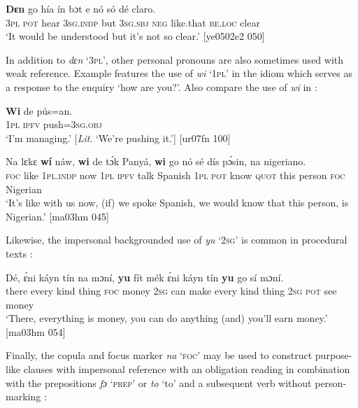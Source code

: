 \ea%
    \label{ex:key:1349}
    \gll \textbf{Dɛn}    go  hía    ín    bɔt  e    nó  só    dé    claro.\\
\textsc{3pl}    \textsc{pot}  hear    \textsc{3sg.indp}  but  \textsc{3sg.sbj}  \textsc{neg}  like.that  \textsc{be.loc}  clear\\

\glt ‘It would be understood but it’s not so clear.’ [ye0502e2 050]
\z

In addition to \textit{dɛn} ‘\textsc{3pl}’, other personal pronouns are also sometimes used with weak reference. Example  features the use of \textit{wi} ‘\textsc{1pl}’ in the idiom which serves as a response to the enquiry ‘how are you?’. Also compare the use of \textit{wi} in :


\ea%
    \label{ex:key:1350}
    \gll \textbf{Wi}  de  pús=an.\\
\textsc{1pl}  \textsc{ipfv}  push=\textsc{3sg.obj}\\

\glt ‘I’m managing.’ [\textit{Lit}. ‘We’re pushing it.’] [ur07fn 100]
\z


\ea%
    \label{ex:key:1351}
    \gll Na  lɛkɛ    \textbf{wí}    náw,  \textbf{wi}  de  tɔ́k  Panyá,  \textbf{wi}  go
nó    sé    dís  pɔ́sin,  na  nigeriano.\\
\textsc{foc}  like    \textsc{1pl.indp}  now    \textsc{1pl}  \textsc{ipfv}  talk  Spanish  \textsc{1pl}  \textsc{pot}
know  \textsc{quot}    this  person  \textsc{foc}  Nigerian\\

\glt ‘It’s like with us now, (if) we spoke Spanish, we would know
that this person, is Nigerian.’ [ma03hm 045]
\z

Likewise, the impersonal backgrounded use of \textit{yu} ‘\textsc{2sg}’ is common in procedural texts :


\ea%
    \label{ex:key:1352}
    \gll Dé,    ɛ́ni    káyn  tín    na  mɔní,  \textbf{yu}  fít  mék
ɛ́ni    káyn  tín    \textbf{yu}  go  sí  mɔní.\\
there  every  kind    thing  \textsc{foc}  money  \textsc{2sg}  can  make
every  kind    thing  \textsc{2sg}  \textsc{pot}  see  money\\

\glt ‘There, everything is money, you can do anything (and) 
you’ll earn money.’ [ma03hm 054]
\z

Finally, the copula and focus marker \textit{na} ‘\textsc{foc}’ may be used to construct purpose-like clauses with impersonal reference with an obligation reading in combination with the prepositions \textit{fɔ} ‘\textsc{prep}’ or \textit{to} ‘to’ and a subsequent verb without person-marking :


